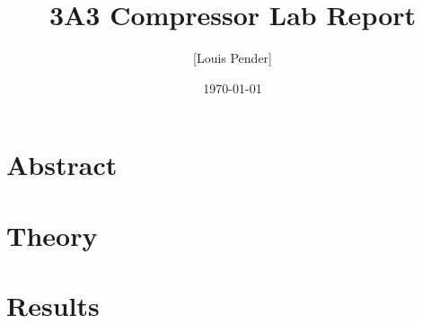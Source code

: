 \documentclass{article}
\title{3A3 Compressor Lab Report}
\author{[Louis Pender]}
\date{\today}
\begin{document}
\maketitle

\section{Abstract}

\section{Theory}






\section{Results}

\end{document}
